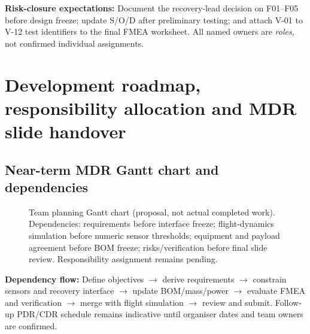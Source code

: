 \normalsize

\textbf{Risk-closure expectations:} Document the recovery-lead decision on F01--F05 before design freeze; update S/O/D after preliminary testing; and attach V-01 to V-12 test identifiers to the final FMEA worksheet. All named owners are \emph{roles}, not confirmed individual assignments.

\section{Development roadmap, responsibility allocation and MDR slide handover}
\label{sec:schedule}

\subsection{Near-term MDR Gantt chart and dependencies}
\begin{figure}[htbp]\centering
{}
\caption{Team planning Gantt chart (proposal, not actual completed work). Dependencies: requirements before interface freeze; flight-dynamics simulation before numeric sensor thresholds; equipment and payload agreement before BOM freeze; risks/verification before final slide review. Responsibility assignment remains pending.}
\label{fig:gantt}
\end{figure}
\textbf{Dependency flow:} Define objectives $\rightarrow$ derive requirements $\rightarrow$ constrain sensors and recovery interface $\rightarrow$ update BOM/mass/power $\rightarrow$ evaluate FMEA and verification $\rightarrow$ merge with flight simulation $\rightarrow$ review and submit. Follow-up PDR/CDR schedule remains indicative until organiser dates and team owners are confirmed.

